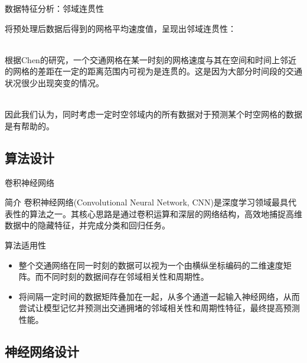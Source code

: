 \documentclass[10pt]{beamer}
\begin{document}
\begin{frame}{数据特征分析：邻域连贯性}
    \par 将预处理后数据后得到的\alert{网格平均速度值}，呈现出\alert{邻域连贯性}：
    \\ \hspace*{\fill} \\
    \par 根据Chen的研究，一个交通网格在某一时刻的网格速度与其在空间和时间上邻近的网格的差距在一定的距离范围内可视为是连贯的。这是因为大部分时间段的交通状况很少出现突变的情况。
    \\ \hspace*{\fill} \\
    \par 因此我们认为，同时考虑\alert{一定时空邻域内的所有数据}对于预测某个时空网格的数据是有帮助的。
\end{frame}

\subsection{算法设计}

\begin{frame}{卷积神经网络}

    \begin{block}{简介}
       卷积神经网络(Convolutional Neural Network, CNN)是深度学习领域最具代表性的算法之一。其核心思路是通过卷积运算和深层的网络结构，高效地捕捉高维数据中的\alert{隐藏特征}，并完成分类和\alert{回归}任务。
    \end{block}
    
    \begin{block}{算法适用性}
        \begin{itemize}
            \item 整个交通网络在同一时刻的数据可以视为一个由横纵坐标编码的\alert{二维速度矩阵}。而不同时刻的数据间存在\alert{邻域相关性}和\alert{周期性}。
            \item 将间隔一定时间的数据矩阵叠加在一起，从多个通道一起输入神经网络，从而尝试让模型记忆并预测出交通拥堵的邻域相关性和周期性特征，最终提高预测性能。
        \end{itemize}
    \end{block}
    
\end{frame}

\subsection{神经网络设计}
\end{document}
